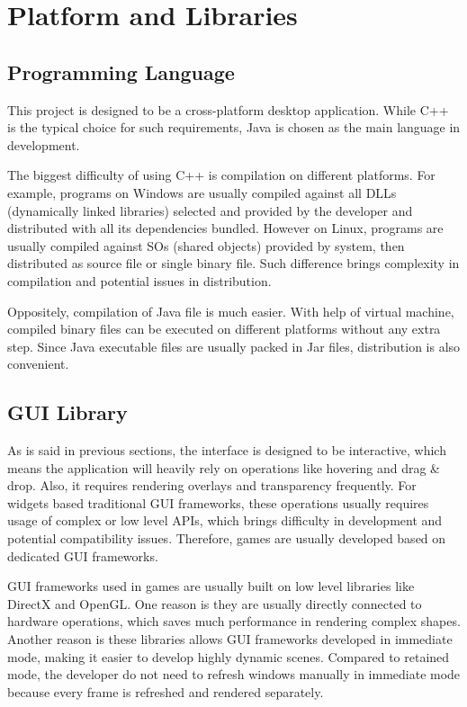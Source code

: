 \documentclass[msc,deptreport, cs]{infthesis}
\begin{document}
\section{Platform and Libraries}

\subsection{Programming Language}

This project is designed to be a cross-platform desktop application. While C++ is the typical choice for such requirements, Java is chosen as the main language in development. 

The biggest difficulty of using C++ is compilation on different platforms. For example, programs on Windows are usually compiled against all DLLs (dynamically linked libraries) selected and provided by the developer and distributed with all its dependencies bundled. However on Linux, programs are usually compiled against SOs (shared objects) provided by system, then distributed as source file or single binary file. Such difference brings complexity in compilation and potential issues in distribution.

Oppositely, compilation of Java file is much easier. With help of virtual machine, compiled binary files can be executed on different platforms without any extra step. Since Java executable files are usually packed in Jar files, distribution is also convenient.

\subsection{GUI Library}

As is said in previous sections, the interface is designed to be interactive, which means the application will heavily rely on operations like hovering and drag \& drop. Also, it requires rendering overlays and transparency frequently. For widgets based traditional GUI frameworks, these operations usually requires usage of complex or low level APIs, which brings difficulty in development and potential compatibility issues. Therefore, games are usually developed based on dedicated GUI frameworks.

GUI frameworks used in games are usually built on low level libraries like DirectX and OpenGL. One reason is they are usually directly connected to hardware operations, which saves much performance in rendering complex shapes. Another reason is these libraries allows GUI frameworks developed in immediate mode, making it easier to develop highly dynamic scenes. Compared to retained mode, the developer do not need to refresh windows manually in immediate mode because every frame is refreshed and rendered separately.
\end{document}

